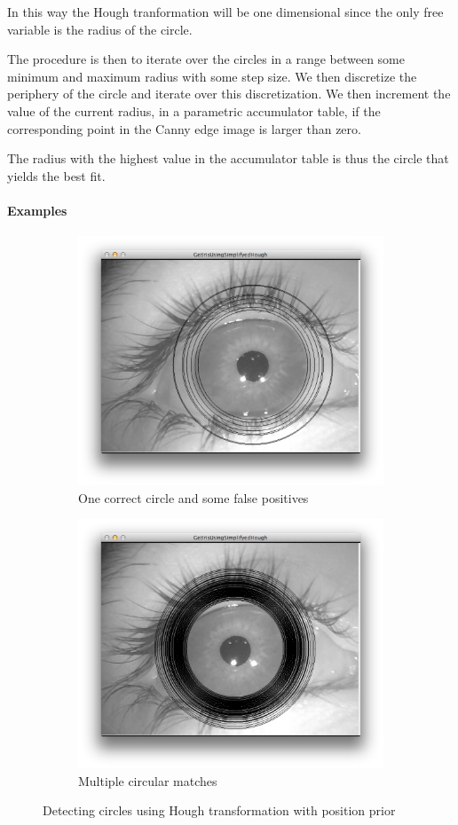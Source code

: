 \documentclass[a4paper,11pt]{article}
\begin{document}
In this way the Hough tranformation will be one dimensional since the only free variable is the radius of the circle.

The procedure is then to iterate over the circles in a range between some minimum and maximum radius with some step size. We then discretize the periphery of the circle and iterate over this discretization. We then increment the value of the current radius, in a parametric accumulator table, if the corresponding point in the Canny edge image is larger than zero.

The radius with the highest value in the accumulator table is thus the circle that yields the best fit.

\paragraph{Examples}
\label{par:examples}
\begin{figure}[H]
\centering
\begin{subfigure}{.48\textwidth}
  \centering
  \includegraphics[width=.8\linewidth]{circhoughavg}
  \caption{One correct circle and some false positives}
  \label{fig:circhoughavg}
\end{subfigure}
\begin{subfigure}{.48\textwidth}
  \centering
  \includegraphics[width=.8\linewidth]{circhoughgood}
  \caption{Multiple circular matches}
  \label{fig:circhoughgood}
\end{subfigure}
\caption{Detecting circles using Hough transformation with position prior }
\label{fig:houghcircles}
\end{figure}
\end{document}

